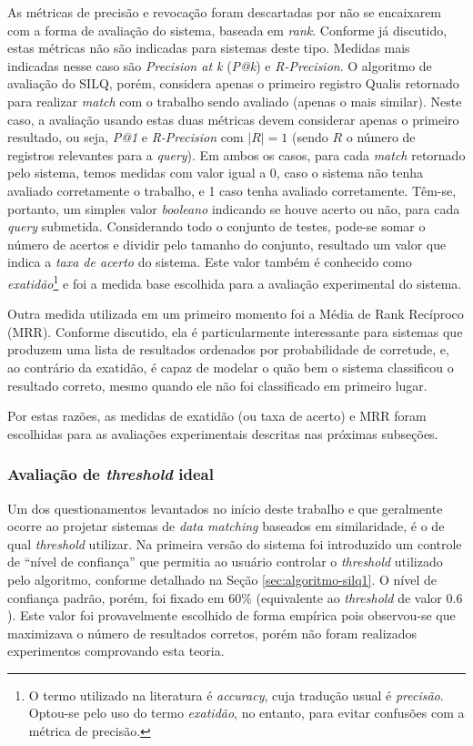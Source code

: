 \documentclass[12pt]{article}
\newcommand{\quotes}[1]{``#1''}
\begin{document}
As métricas de precisão e revocação foram descartadas por não se encaixarem com a forma de avaliação do sistema, baseada em \textit{rank}. Conforme já discutido, estas métricas não são indicadas para sistemas deste tipo. Medidas mais indicadas nesse caso são \textit{Precision at k} (\textit{P@k}) e \textit{R-Precision}. O algoritmo de avaliação do SILQ, porém, considera apenas o primeiro registro Qualis retornado para realizar \textit{match} com o trabalho sendo avaliado (apenas o mais similar). Neste caso, a avaliação usando estas duas métricas devem considerar apenas o primeiro resultado, ou seja, \textit{P@1} e \textit{R-Precision} com $|R| = 1$ (sendo $R$ o número de registros relevantes para a \textit{query}). Em ambos os casos, para cada \textit{match} retornado pelo sistema, temos medidas com valor igual a 0, caso o sistema não tenha avaliado corretamente o trabalho, e 1 caso tenha avaliado corretamente. Têm-se, portanto, um simples valor \textit{booleano} indicando se houve acerto ou não, para cada \textit{query} submetida. Considerando todo o conjunto de testes, pode-se somar o número de acertos e dividir pelo tamanho do conjunto, resultado um valor que indica a \textit{taxa de acerto} do sistema. Este valor também é conhecido como \textit{exatidão}\footnote{O termo utilizado na literatura é \textit{accuracy}, cuja tradução usual é \textit{precisão}. Optou-se pelo uso do termo \textit{exatidão}, no entanto, para evitar confusões com a métrica de precisão.} e foi a medida base escolhida para a  avaliação experimental do sistema.

Outra medida utilizada em um primeiro momento foi a Média de Rank Recíproco (MRR). Conforme discutido, ela é particularmente interessante para sistemas que produzem uma lista de resultados ordenados por probabilidade de corretude, e, ao contrário da exatidão, é capaz de modelar o quão bem o sistema classificou o resultado correto, mesmo quando ele não foi classificado em primeiro lugar.

Por estas razões, as medidas de exatidão (ou taxa de acerto) e MRR foram escolhidas para as avaliações experimentais descritas nas próximas subseções.

\subsubsection{Avaliação de \textit{threshold} ideal}

 Um dos questionamentos levantados no início deste trabalho e que geralmente ocorre ao projetar sistemas de \textit{data matching} baseados em similaridade, é o de qual \textit{threshold} utilizar. Na primeira versão do sistema foi introduzido um controle de \quotes{nível de confiança} que permitia ao usuário controlar o \textit{threshold} utilizado pelo algoritmo, conforme detalhado na Seção \ref{sec:algoritmo-silq1}. O nível de confiança padrão, porém, foi fixado em 60\% (equivalente ao \textit{threshold} de valor $0.6$). Este valor foi provavelmente escolhido de forma empírica pois observou-se que maximizava o número de resultados corretos, porém não foram realizados experimentos comprovando esta teoria.
\end{document}
